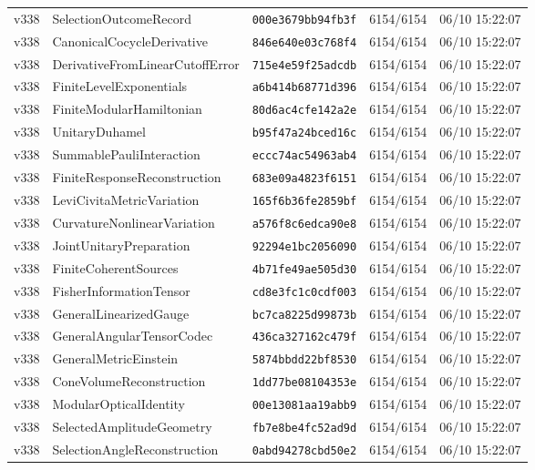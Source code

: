 \documentclass[11pt]{article}
\theoremstyle{definition}\newtheorem{deriv}{Derivation}
\begin{document}
{\begin{longtable}{@{}lllll@{}}
v338 & SelectionOutcomeRecord & \texttt{000e3679bb94fb3f} & 6154/6154 & 06/10 15:22:07 \\
v338 & CanonicalCocycleDerivative & \texttt{846e640e03c768f4} & 6154/6154 & 06/10 15:22:07 \\
v338 & DerivativeFromLinearCutoffError & \texttt{715e4e59f25adcdb} & 6154/6154 & 06/10 15:22:07 \\
v338 & FiniteLevelExponentials & \texttt{a6b414b68771d396} & 6154/6154 & 06/10 15:22:07 \\
v338 & FiniteModularHamiltonian & \texttt{80d6ac4cfe142a2e} & 6154/6154 & 06/10 15:22:07 \\
v338 & UnitaryDuhamel & \texttt{b95f47a24bced16c} & 6154/6154 & 06/10 15:22:07 \\
v338 & SummablePauliInteraction & \texttt{eccc74ac54963ab4} & 6154/6154 & 06/10 15:22:07 \\
v338 & FiniteResponseReconstruction & \texttt{683e09a4823f6151} & 6154/6154 & 06/10 15:22:07 \\
v338 & LeviCivitaMetricVariation & \texttt{165f6b36fe2859bf} & 6154/6154 & 06/10 15:22:07 \\
v338 & CurvatureNonlinearVariation & \texttt{a576f8c6edca90e8} & 6154/6154 & 06/10 15:22:07 \\
v338 & JointUnitaryPreparation & \texttt{92294e1bc2056090} & 6154/6154 & 06/10 15:22:07 \\
v338 & FiniteCoherentSources & \texttt{4b71fe49ae505d30} & 6154/6154 & 06/10 15:22:07 \\
v338 & FisherInformationTensor & \texttt{cd8e3fc1c0cdf003} & 6154/6154 & 06/10 15:22:07 \\
v338 & GeneralLinearizedGauge & \texttt{bc7ca8225d99873b} & 6154/6154 & 06/10 15:22:07 \\
v338 & GeneralAngularTensorCodec & \texttt{436ca327162c479f} & 6154/6154 & 06/10 15:22:07 \\
v338 & GeneralMetricEinstein & \texttt{5874bbdd22bf8530} & 6154/6154 & 06/10 15:22:07 \\
v338 & ConeVolumeReconstruction & \texttt{1dd77be08104353e} & 6154/6154 & 06/10 15:22:07 \\
v338 & ModularOpticalIdentity & \texttt{00e13081aa19abb9} & 6154/6154 & 06/10 15:22:07 \\
v338 & SelectedAmplitudeGeometry & \texttt{fb7e8be4fc52ad9d} & 6154/6154 & 06/10 15:22:07 \\
v338 & SelectionAngleReconstruction & \texttt{0abd94278cbd50e2} & 6154/6154 & 06/10 15:22:07 \\

\end{longtable}}
\end{document}
